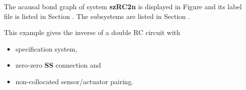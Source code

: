 

   The acausal bond graph of system \textbf{szRC2n} is
   displayed in Figure  and its label
   file is listed in Section .
   The subsystems are listed in Section .

This example gives the inverse of a double RC circuit with
\begin{itemize}
\item specification system,
\item zero-zero \textbf{SS} connection and
\item non-collocated sensor/actuator pairing.
\end{itemize}



